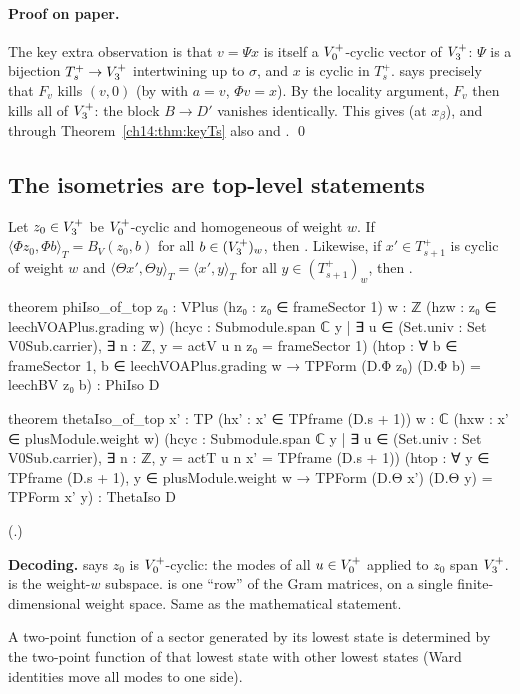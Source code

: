 \paragraph{Proof on paper.}  The key extra observation is that $v=\Psi x$ is itself a
$V_0^{+}$-cyclic vector of $V_3^{+}$: $\Psi$ is a bijection $T_s^+\to V_3^{+}$ intertwining up to $\sigma$,
and $x$ is cyclic in $T_s^+$.   says precisely that $F_v$ kills $(v,0)$ (by
 with $a=v$, $\Phi v=x$).  By the locality argument, $F_v$ then kills all of $V_3^{+}$:
the block $B\to D'$ vanishes identically.  This gives  (at $x_\beta$), and through
Theorem~\ref{ch14:thm:keyTs} also  and . \qed

\subsection{The isometries are top-level statements}

\begin{theorem}\label{ch14:thm:isotop}
Let $z_0\in V_3^{+}$ be $V_0^{+}$-cyclic and homogeneous of weight $w$.  If
$\langle\Phi z_0,\Phi b\rangle_T=B_V(z_0,b)$ for all $b\in(V_3^{+})_w$, then .  Likewise,
if $x'\in T_{s+1}^+$ is cyclic of weight $w$ and $\langle\Theta x',\Theta y\rangle_T=\langle x',y\rangle_T$
for all $y\in(T_{s+1}^+)_w$, then .
\end{theorem}
\begin{leancode}
theorem phiIso_of_top {z₀ : VPlus} (hz₀ : z₀ ∈ frameSector 1) {w : ℤ}
    (hzw : z₀ ∈ leechVOAPlus.grading w)
    (hcyc : Submodule.span ℂ {y | ∃ u ∈ (Set.univ : Set V0Sub.carrier), ∃ n : ℤ, y = actV u n z₀}
      = frameSector 1)
    (htop : ∀ b ∈ frameSector 1, b ∈ leechVOAPlus.grading w →
      TPForm (D.Φ z₀) (D.Φ b) = leechBV z₀ b) : PhiIso D

theorem thetaIso_of_top {x' : TP} (hx' : x' ∈ TPframe (D.s + 1)) {w : ℂ}
    (hxw : x' ∈ plusModule.weight w)
    (hcyc : Submodule.span ℂ {y | ∃ u ∈ (Set.univ : Set V0Sub.carrier), ∃ n : ℤ, y = actT u n x'}
      = TPframe (D.s + 1))
    (htop : ∀ y ∈ TPframe (D.s + 1), y ∈ plusModule.weight w →
      TPForm (D.Θ x') (D.Θ y) = TPForm x' y) : ThetaIso D
\end{leancode}
(.)

\begin{dictionary}
\textbf{Decoding.}   says $z_0$ is $V_0^{+}$-cyclic: the modes of all $u\in V_0^{+}$ applied to
$z_0$ span $V_3^{+}$.   is the weight-$w$ subspace.   is one ``row''
of the Gram matrices, on a single finite-dimensional weight space.  Same as the mathematical statement.
\end{dictionary}
\begin{physics}
A two-point function of a sector generated by its lowest state is determined by the two-point function of that lowest state with other lowest states (Ward identities move all modes to one side).
\end{physics}



